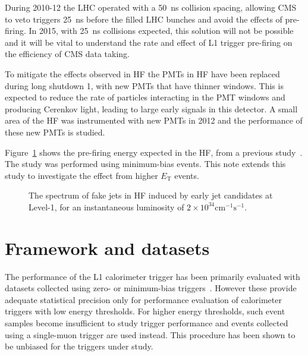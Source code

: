 \documentclass[11pt]{cmspaperpdf}
\newcommand{\et}{\ensuremath{E_{\textrm{T}}}\xspace}
\begin{document}
During 2010-12 the LHC operated with a 50~ns collision spacing, allowing CMS to veto triggers 25~ns before the filled LHC bunches and avoid the effects of pre-firing. In 2015, with 25~ns collisions expected, this solution will not be possible and it will be vital to understand the rate and effect of L1 trigger pre-firing on the efficiency of CMS data taking.

To mitigate the effects observed in HF the PMTs in HF have been replaced during long shutdown 1, with new PMTs that have thinner windows. This is expected to reduce the rate of particles interacting in the PMT windows and producing Cerenkov light, leading to large early signals in this detector. A small area of the HF was instrumented with new PMTs in 2012 and the performance of these new PMTs is studied.

Figure~\ref{fig:hcaltdr_plot} shows the pre-firing energy expected in the HF, from a previous study~\cite{hcaltdr}. The study was performed using minimum-bias events. This note extends this study to investigate the effect from higher \et events.

\vspace{5mm}
\begin{figure}[h!]
\centering
\setlength\fboxsep{0pt}
\setlength\fboxrule{0.2pt}
\caption{The spectrum of fake jets in HF induced by early jet candidates at Level-1, for an instantaneous luminosity of $2 \times 10^{34} \textrm{cm}^{-1} \textrm{s}^{-1}$.}
\label{fig:hcaltdr_plot}
\end{figure}
\vspace{5mm}

\section{Framework and datasets}
\label{sec:tech}

The performance of the L1 calorimeter trigger has been primarily evaluated with datasets collected using zero- or minimum-bias triggers~\cite{2012note}. However these provide adequate statistical precision only for performance evaluation of calorimeter triggers with low energy thresholds. For higher energy thresholds, such event samples become insufficient to study trigger performance and events collected using a single-muon trigger are used instead. This procedure has been shown to be unbiased for the triggers under study.
\end{document}
